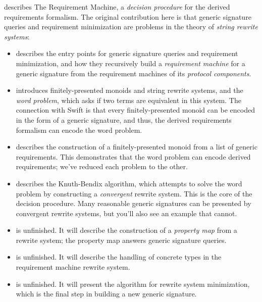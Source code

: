 \documentclass[../generics]{subfiles}
\begin{document}
 describes The Requirement Machine, a \emph{decision procedure} for the derived requirements formalism. The original contribution here is that generic signature queries and requirement minimization are problems in the theory of \emph{string rewrite systems}:
\begin{itemize}
\item {} describes the entry points for generic signature queries and requirement minimization, and how they recursively build a \emph{requirement machine} for a generic signature from the requirement machines of its \emph{protocol components}.

\item {} introduces finitely-presented monoids and string rewrite systems, and the \emph{word problem}, which asks if two terms are equivalent in this system. The connection with Swift is that every finitely-presented monoid can be encoded in the form of a generic signature, and thus, the derived requirements formalism can encode the word problem.

\item {} describes the construction of a finitely-presented monoid from a list of generic requirements. This demonstrates that the word problem can encode derived requirements; we've reduced each problem to the other.

\item {} describes the Knuth-Bendix algorithm, which attempts to solve the word problem by constructing a \emph{convergent} rewrite system. This is the core of the decision procedure. Many reasonable generic signatures can be presented by convergent rewrite systems, but you'll also see an example that cannot.

\item {} is unfinished. It will describe the construction of a \emph{property map} from a rewrite system;  the property map answers generic signature queries.

\item {} is unfinished. It will describe the handling of concrete types in the requirement machine rewrite system.

\item {} is unfinished. It will present the algorithm for rewrite system minimization, which is the final step in building a new generic signature.
\end{itemize}
\end{document}
